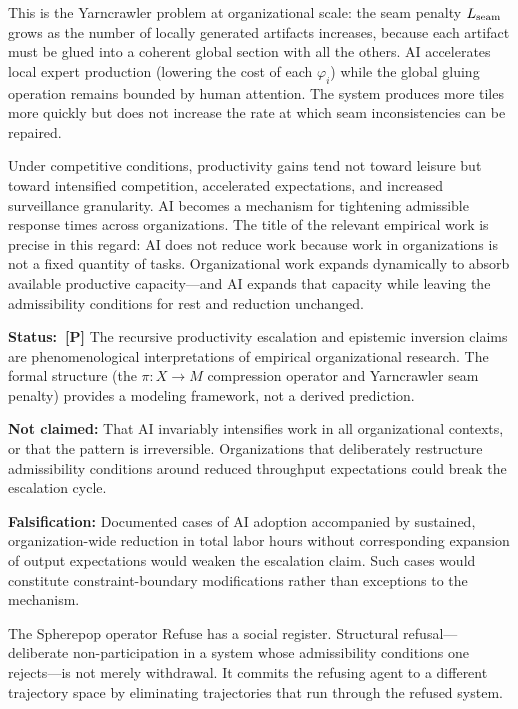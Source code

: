 This is the Yarncrawler problem at organizational scale: the seam penalty
$L_{\rm seam}$ grows as the number of locally generated artifacts increases,
because each artifact must be glued into a coherent global section with all the
others. AI accelerates local expert production (lowering the cost of each
$\varphi_i$) while the global gluing operation remains bounded by human attention.
The system produces more tiles more quickly but does not increase the rate at
which seam inconsistencies can be repaired.

\claimP Under competitive conditions, productivity gains tend not toward leisure
but toward intensified competition, accelerated expectations, and increased
surveillance granularity. AI becomes a mechanism for tightening admissible
response times across organizations. The title of the relevant empirical
work is precise in this regard: AI does not reduce work because work in
organizations is not a fixed quantity of tasks. Organizational work expands
dynamically to absorb available productive capacity---and AI expands that
capacity while leaving the admissibility conditions for rest and reduction
unchanged.

\begin{constraintboundary}
\textbf{Status:~\textbf{[P]}} The recursive productivity escalation and
epistemic inversion claims are phenomenological interpretations of empirical
organizational research. The formal structure (the $\pi: X \to M$ compression
operator and Yarncrawler seam penalty) provides a modeling framework, not a
derived prediction.

\textbf{Not claimed:} That AI invariably intensifies work in all organizational
contexts, or that the pattern is irreversible. Organizations that deliberately
restructure admissibility conditions around reduced throughput expectations
could break the escalation cycle.

\textbf{Falsification:} Documented cases of AI adoption accompanied by sustained,
organization-wide reduction in total labor hours without corresponding expansion
of output expectations would weaken the escalation claim. Such cases would
constitute constraint-boundary modifications rather than exceptions to the
mechanism.
\end{constraintboundary}

The Spherepop operator Refuse has a social register. Structural
refusal---deliberate non-participation in a system whose admissibility conditions
one rejects---is not merely withdrawal. It commits the refusing agent to a
different trajectory space by eliminating trajectories that run through the
refused system.

